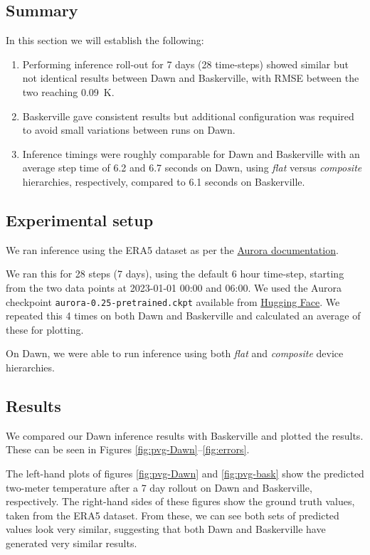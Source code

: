 \subsection{Summary}

In this section we will establish the following:

\begin{enumerate}
    \item Performing inference roll-out for 7 days (28 time-steps) showed similar but not identical results between Dawn and Baskerville, with RMSE between the two reaching \qty{0.09}{\kelvin}.
    \item Baskerville gave consistent results but additional configuration was required to avoid small variations between runs on Dawn.
    \item Inference timings were roughly comparable for Dawn and Baskerville with an average step time of 6.2 and 6.7 seconds on Dawn, using \textit{flat} versus \textit{composite} hierarchies, respectively, compared to 6.1 seconds on Baskerville.
\end{enumerate}

\subsection{Experimental setup}

We ran inference using the ERA5 dataset as per the \href{https://microsoft.github.io/aurora/usage.html}{Aurora documentation}.

We ran this for 28 steps (7 days), using the default 6 hour time-step, starting from the two data points at 2023-01-01 00:00 and 06:00. We used the Aurora checkpoint {\tt aurora-0.25-pretrained.ckpt} available from \href{https://huggingface.co/microsoft/aurora}{Hugging Face}. We repeated this 4 times on both Dawn and Baskerville and calculated an average of these for plotting.

On Dawn, we were able to run inference using both \textit{flat} and \textit{composite} device hierarchies.

\subsection{Results}
\label{section:results}

We compared our Dawn inference results with Baskerville and plotted the results. These can be seen in Figures \ref{fig:pvg-Dawn}--\ref{fig:errors}.

The left-hand plots of figures \ref{fig:pvg-Dawn} and \ref{fig:pvg-bask} show the predicted two-meter temperature after a 7 day rollout on Dawn and Baskerville, respectively. The right-hand sides of these figures show the ground truth values, taken from the ERA5 dataset.
From these, we can see both sets of predicted values look very similar, suggesting that both Dawn and Baskerville have generated very similar results.

